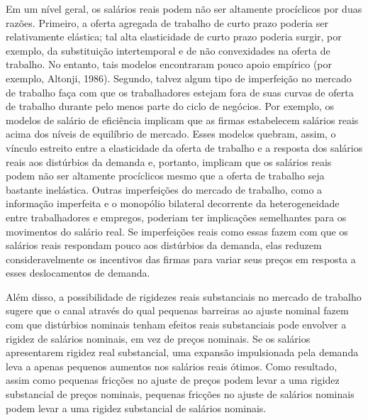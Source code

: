 \documentclass[12pt]{article}
\begin{document}
Em um nível geral, os salários reais podem não ser altamente procíclicos por duas razões. Primeiro, a oferta agregada de trabalho de curto prazo poderia ser relativamente elástica; tal alta elasticidade de curto prazo poderia surgir, por exemplo, da substituição intertemporal e de não convexidades na oferta de trabalho. No entanto, tais modelos encontraram pouco apoio empírico (por exemplo, Altonji, 1986). Segundo, talvez algum tipo de imperfeição no mercado de trabalho faça com que os trabalhadores estejam fora de suas curvas de oferta de trabalho durante pelo menos parte do ciclo de negócios. Por exemplo, os modelos de salário de eficiência implicam que as firmas estabelecem salários reais acima dos níveis de equilíbrio de mercado. Esses modelos quebram, assim, o vínculo estreito entre a elasticidade da oferta de trabalho e a resposta dos salários reais aos distúrbios da demanda e, portanto, implicam que os salários reais podem não ser altamente procíclicos mesmo que a oferta de trabalho seja bastante inelástica. Outras imperfeições do mercado de trabalho, como a informação imperfeita e o monopólio bilateral decorrente da heterogeneidade entre trabalhadores e empregos, poderiam ter implicações semelhantes para os movimentos do salário real. Se imperfeições reais como essas fazem com que os salários reais respondam pouco aos distúrbios da demanda, elas reduzem consideravelmente os incentivos das firmas para variar seus preços em resposta a esses deslocamentos de demanda.

Além disso, a possibilidade de rigidezes reais substanciais no mercado de trabalho sugere que o canal através do qual pequenas barreiras ao ajuste nominal fazem com que distúrbios nominais tenham efeitos reais substanciais pode envolver a rigidez de salários nominais, em vez de preços nominais. Se os salários apresentarem rigidez real substancial, uma expansão impulsionada pela demanda leva a apenas pequenos aumentos nos salários reais ótimos. Como resultado, assim como pequenas fricções no ajuste de preços podem levar a uma rigidez substancial de preços nominais, pequenas fricções no ajuste de salários nominais podem levar a uma rigidez substancial de salários nominais.
\end{document}
